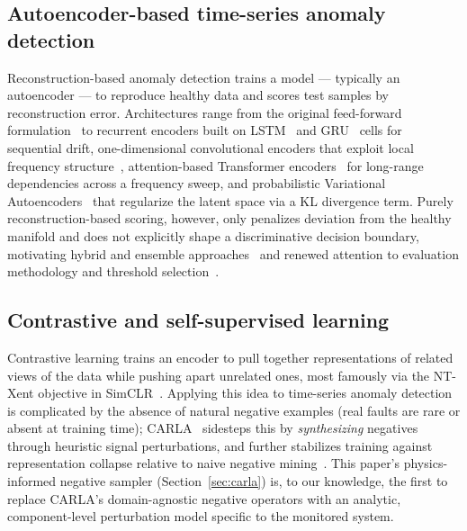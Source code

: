 \documentclass[11pt,a4paper]{article}
\begin{document}
\subsection{Autoencoder-based time-series anomaly detection}
Reconstruction-based anomaly detection trains a model --- typically an autoencoder --- to
reproduce healthy data and scores test samples by reconstruction error. Architectures
range from the original feed-forward formulation~\cite{rumelhart1986backprop} to recurrent
encoders built on LSTM~\cite{hochreiter1997lstm} and GRU~\cite{cho2014gru} cells for
sequential drift, one-dimensional convolutional encoders that exploit local frequency
structure~\cite{kiranyaz2019survey}, attention-based Transformer
encoders~\cite{vaswani2017attention} for long-range dependencies across a frequency sweep,
and probabilistic Variational Autoencoders~\cite{kingma2013autoencoding} that regularize
the latent space via a KL divergence term. Purely reconstruction-based scoring, however,
only penalizes deviation from the healthy manifold and does not explicitly shape a
discriminative decision boundary, motivating hybrid and ensemble
approaches~\cite{zimmerer2018contextvae,gao2020robusttad,campos2021unsupervised} and
renewed attention to evaluation methodology and threshold
selection~\cite{yuan2022trustworthy}.

\subsection{Contrastive and self-supervised learning}
Contrastive learning trains an encoder to pull together representations of related views
of the data while pushing apart unrelated ones, most famously via the NT-Xent objective in
SimCLR~\cite{chen2020simclr}. Applying this idea to time-series anomaly detection is
complicated by the absence of natural negative examples (real faults are rare or absent
at training time); CARLA~\cite{darban2023carla} sidesteps this by \emph{synthesizing}
negatives through heuristic signal perturbations, and further stabilizes training against
representation collapse relative to naive negative
mining~\cite{chen2023harnessing,zhang2025encodethendecompose}. This paper's
physics-informed negative sampler (Section~\ref{sec:carla}) is, to our knowledge, the
first to replace CARLA's domain-agnostic negative operators with an analytic,
component-level perturbation model specific to the monitored system.
\end{document}
